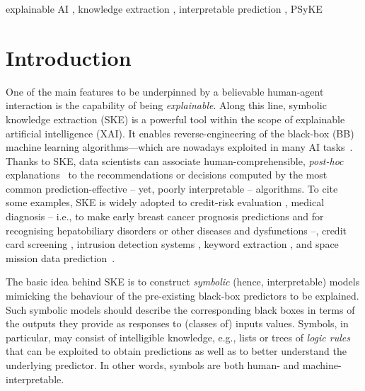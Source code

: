 \documentclass[
]{ceurart}
\begin{document}
\begin{keywords}
	explainable AI 
	\sep
  	knowledge extraction 
	\sep
	interpretable prediction 
	\sep
  	PSyKE
\end{keywords}

\maketitle

\section{Introduction}

One of the main features to be underpinned by a believable human-agent interaction is the capability of being \emph{explainable}. 
%
Along this line, symbolic knowledge extraction (SKE) is a powerful tool within the scope of explainable artificial intelligence (XAI).
%
It enables reverse-engineering of the black-box (BB) machine learning algorithms---which are nowadays exploited in many AI tasks~\cite{rocha2012far}.
%
Thanks to SKE, data scientists can associate human-comprehensible, \emph{post-hoc} explanations~\cite{KENNY2021103459} to the recommendations or decisions computed by the most common prediction-effective -- yet, poorly interpretable -- algorithms.
%
To cite some examples, SKE is widely adopted to credit-risk evaluation \cite{baesens2003using,baesens2001building,steiner2006using}, medical diagnosis -- i.e., to make early breast cancer prognosis predictions \cite{franco2007early} and for recognising hepatobiliary disorders \cite{hayashi2000comparison} or other diseases and dysfunctions \cite{bologna1997three} --, credit card screening \cite{setiono2011rule}, intrusion detection systems \cite{hofmann2003rule}, keyword extraction \cite{azcarraga2012keyword}, and space mission data prediction~\cite{sabbatini22LPFSKE}.

The basic idea behind SKE is to construct \emph{symbolic} (hence, interpretable) models mimicking the behaviour of the pre-existing black-box predictors to be explained.
%
Such symbolic models should describe the corresponding black boxes in terms of the outputs they provide as responses to (classes of) inputs values.
%
Symbols, in particular, may consist of intelligible knowledge, e.g., lists or trees of \emph{logic rules} that can be exploited to obtain predictions as well as to better understand the underlying predictor.
%
In other words, symbols are both human- and machine-interpretable.
\end{document}
